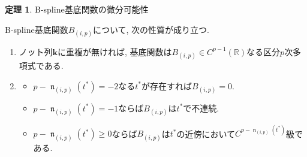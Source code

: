 \documentclass{jsarticle}
\newcommand\setR{\mathbb{R}}
\DeclareMathOperator{\N}{\mathfrak{n}}
\theoremstyle{definition}%
\newtheorem{thm}{定理}
\begin{document}
\begin{screen}
	\begin{thm}
		\label{Thm305}
		B-spline基底関数の微分可能性

        B-spline基底関数$B_{(i,p)}$について, 次の性質が成り立つ.
        \begin{enumerate}
			\renewcommand{\labelenumi}{(\roman{enumi})}
			\item ノット列$\bm{k}$に重複が無ければ, 基底関数は$B_{(i,p)}\in C^{p-1}(\setR)$なる区分$p$次多項式である.
			\item
            \begin{itemize}
                \item $p-\N_{(i,p)}(t^*)=-2$なる$t^*$が存在すれば$B_{(i,p)}= 0$.
                \item $p-\N_{(i,p)}(t^*)=-1$ならば$B_{(i,p)}$は$t^*$で不連続.
                \item $p-\N_{(i,p)}(t^*)\ge 0$ならば$B_{(i,p)}$は$t^*$の近傍において$C^{p-\N_{(i,p)}(t^*)}$級である.
            \end{itemize}
		\end{enumerate}
	\end{thm}
\end{screen}
\newpage
\end{document}
